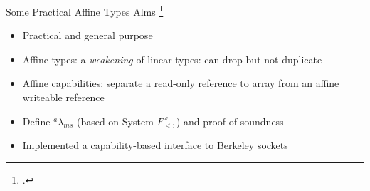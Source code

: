\documentclass[aspectratio=169]{beamer}
\begin{document}
\begin{frame}{Some Practical Affine Types}
  Alms \footcite{tov_practical_2011}
    \begin{itemize}
        \item Practical and general purpose
        \item Affine types: a \emph{weakening} of linear types: can drop but not duplicate
        \item Affine capabilities: separate a read-only reference to array from an affine writeable reference
        \item Define $^{a}\lambda_{ms}$ (based on System $F^{\omega}_{<:}$) and proof of soundness 
        \item Implemented a capability-based interface to Berkeley sockets
    \end{itemize}
\end{frame}
\end{document}
